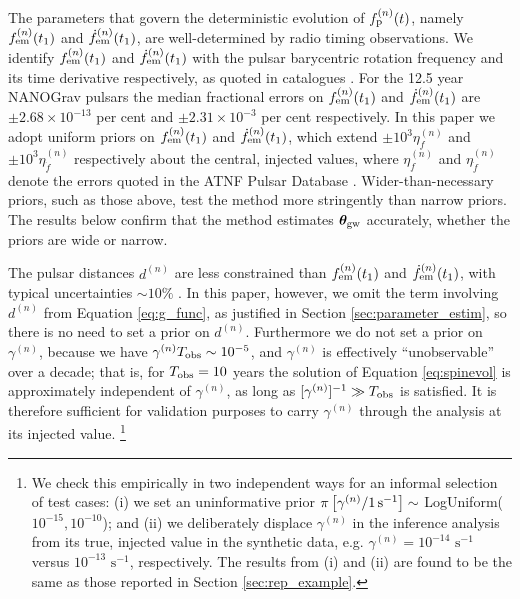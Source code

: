 \documentclass[fleqn,usenatbib,useAMS]{mnras}
\begin{document}
The parameters that govern the deterministic evolution of $f_{\rm p}^{(n)}(t)$, namely $f_{\rm em}^{(n)} (t_1)$ and $\dot{f}_{\rm em}^{(n)} (t_1)$, are well-determined by radio timing observations. We identify $f_{\rm em}^{(n)} (t_1)$ and $\dot{f}_{\rm em}^{(n)} (t_1)$ with the pulsar barycentric rotation frequency and its time derivative respectively, as quoted in catalogues \citep{Manchester2005}. For the 12.5 year NANOGrav pulsars the median fractional errors on $f_{\rm em}^{(n)}(t_1)$ and $\dot{f}_{\rm em}^{(n)}(t_1)$ are $\pm 2.68 \times 10^{-13} $ per cent and $\pm 2.31 \times 10^{-3}$ per cent respectively. In this paper we adopt uniform priors on $f_{\rm em}^{(n)}(t_1)$ and $\dot{f}_{\rm em}^{(n)}(t_1)$, which extend $\pm 10^3 \eta_f^{(n)}$ and $\pm 10^3 \eta_{\dot{f}}^{(n)}$ respectively about the central, injected values, where $\eta_f^{(n)}$ and $\eta_{\dot{f}}^{(n)}$ denote the errors quoted in the ATNF Pulsar Database \citep{Manchester2005}. Wider-than-necessary priors, such as those above, test the method more stringently than narrow priors. The results below confirm that the method estimates ${\boldsymbol{\theta}}_{\rm gw}$ accurately, whether the priors are wide or narrow. \newline 


The pulsar distances $d^{(n)}$ are less constrained than $f_{\rm em}^{(n)} (t_1)$ and $\dot{f}_{\rm em}^{(n)} (t_1)$, with typical uncertainties $\sim 10 \%$ \citep{Yao2017,Arzoumanian2018ApJS..235...37A}. In this paper, however, we omit the term involving $d^{(n)}$ from Equation \eqref{eq:g_func}, as justified in Section \ref{sec:parameter_estim}, so there is no need to set a prior on $d^{(n)}$. Furthermore we do not set a prior on $\gamma^{(n)}$, because we have $\gamma^{(n)} T_{\rm obs} \sim 10^{-5}$, and $\gamma^{(n)}$ is effectively ``unobservable'' over a decade; that is, for $T_{\rm obs}=10$ years the solution of Equation \eqref{eq:spinevol} is approximately independent of $\gamma^{(n)}$, as long as $[\gamma^{(n)}]^{-1} \gg T_{\rm obs}$ is satisfied. It is therefore sufficient for validation purposes to carry $\gamma^{(n)}$ through the analysis at its injected value. \footnote{We check this empirically in two independent ways for an informal selection of test cases: (i) we set an uninformative prior $\pi\left [\gamma^{(n)} / 1 \, {\rm s^{-1}} \right] \sim$ LogUniform($10^{-15}, 10^{-10}$); and (ii) we deliberately displace $\gamma^{(n)}$ in the inference analysis from its true, injected value in the synthetic data, e.g. $\gamma^{(n)} = 10^{-14} \text{ s}^{-1}$ versus $10^{-13} \text{ s}^{-1}$, respectively. The results from (i) and (ii) are found to be the same as those reported in Section \ref{sec:rep_example}.} \newline 
\end{document}
